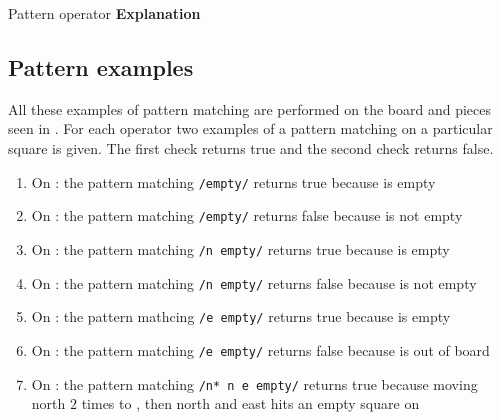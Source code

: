          {Pattern operator                       }{\textbf{Explanation}}{
}

\subsection{Pattern examples}
\label{sec:patternexamples}
All these examples of pattern matching are performed on the board and pieces
seen in . For each operator two examples of a pattern
matching on a particular square is given. The first check returns true and the
second check returns false.

\begin{enumerate}[noitemsep]
  \item On : the pattern matching \texttt{/empty/} returns true because
     is empty
  \item On : the pattern matching \texttt{/empty/} returns false because
     is not empty
  \item On : the pattern matching \texttt{/n empty/} returns true
    because  is empty
  \item On : the pattern matching \texttt{/n empty/} returns false
    because  is not empty
  \item On : the pattern mathcing \texttt{/e empty/} returns true
    because  is empty
  \item On : the pattern matching \texttt{/e empty/} returns false
    because  is out of board
  \item On : the pattern matching \texttt{/n* n e empty/}
  returns true because moving north $2$ times to , then north
  and east hits an empty square on 
\end{enumerate}

